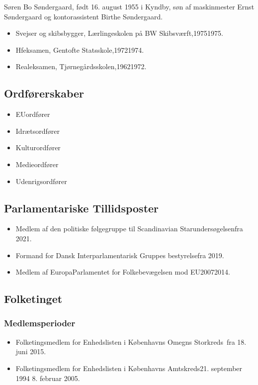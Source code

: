 \documentclass[11pt, a4paper]{awesome-cv}
\begin{document}
\makecvheader[R]
\makelettertitle
\begin{cvletter}
Søren Bo Søndergaard, født 16. august 1955 i Kyndby, søn af maskinmester Ernst Søndergaard og kontorassistent Birthe Søndergaard.

\begin{itemize}
\item Svejser og skibsbygger, Lærlingeskolen på BW Skibsværft,19751975.
\item Hfeksamen, Gentofte Statsskole,19721974.
\item Realeksamen, Tjørnegårdsskolen,19621972.
\end{itemize}
\subsection*{Ordførerskaber}
\begin{itemize}
\item EUordfører
\item Idrætsordfører
\item Kulturordfører
\item Medieordfører
\item Udenrigsordfører
\end{itemize}
\subsection*{Parlamentariske Tillidsposter}
\begin{itemize}
\item Medlem af den politiske følgegruppe til Scandinavian Starundersøgelsenfra 2021.
\item Formand for Dansk Interparlamentarisk Gruppes bestyrelsefra 2019.
\item Medlem af EuropaParlamentet for Folkebevægelsen mod EU20072014.
\end{itemize}
\subsection*{Folketinget}
\subsubsection*{Medlemsperioder}
\begin{itemize}
\item Folketingsmedlem for Enhedslisten i Københavns Omegns Storkreds fra 18. juni 2015.
\item Folketingsmedlem for Enhedslisten i Københavns Amtskreds21. september 1994  8. februar 2005.
\end{itemize}

\end{cvletter}
\end{document}
